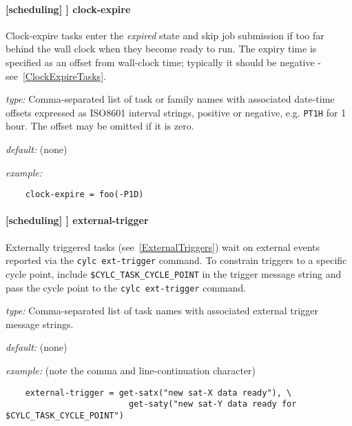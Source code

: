 \paragraph[clock-expire]{[scheduling] \textrightarrow [[special tasks]] \textrightarrow clock-expire}
\label{ClockExpireRef}

Clock-expire tasks enter the {\em expired} state and skip job submission if too
far behind the wall clock when they become ready to run.  The expiry time is
specified as an offset from wall-clock time; typically it should be negative -
see~\ref{ClockExpireTasks}. 

\begin{myitemize}
    \item {\em type:} Comma-separated list of task or family names with
        associated date-time offsets expressed as ISO8601 interval strings,
        positive or negative, e.g. \lstinline=PT1H= for 1 hour.  The offset
        may be omitted if it is zero.
    \item {\em default:} (none)
    \item {\em example:}
\begin{lstlisting}
    clock-expire = foo(-P1D)
\end{lstlisting}
\end{myitemize}

\paragraph[external-trigger]{[scheduling] \textrightarrow [[special tasks]] \textrightarrow external-trigger}

Externally triggered tasks (see~\ref{ExternalTriggers}) wait on external events
reported via the \lstinline=cylc ext-trigger= command.  To constrain triggers
to a specific cycle point, include \lstinline=$CYLC_TASK_CYCLE_POINT= in the
trigger message string and pass the cycle point to the \lstinline=cylc ext-trigger= command.

\begin{myitemize}
    \item {\em type:} Comma-separated list of task names with associated
        external trigger message strings.
    \item {\em default:} (none)
    \item {\em example:} (note the comma and line-continuation character)
\begin{lstlisting}
    external-trigger = get-satx("new sat-X data ready"), \
                         get-saty("new sat-Y data ready for $CYLC_TASK_CYCLE_POINT")
\end{lstlisting}
\end{myitemize}


